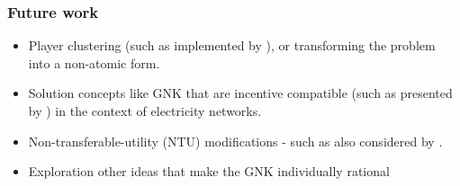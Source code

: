 \documentclass{beamer}
\begin{document}
\begin{frame}
\frametitle{Future work}
\begin{itemize}
\item	Player clustering (such as implemented by \cite{DBLP:journals/corr/abs-1903-10965}), or transforming the problem into a non-atomic form.
\item	Solution concepts like GNK that are incentive compatible (such as presented by \cite{myerson1,Salamanca2019}) in the context of electricity networks.
\item	Non-transferable-utility (NTU) modifications - such as also considered by \cite{value1}.
\item	Exploration other ideas that make the GNK individually rational
\end{itemize}
\end{frame}
\end{document}
